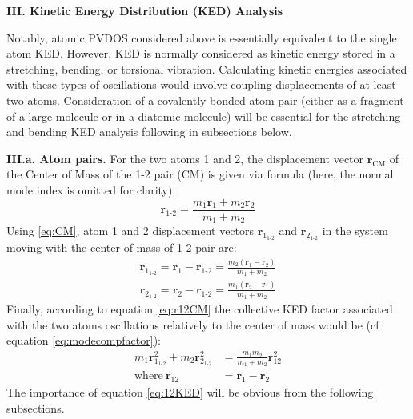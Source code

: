 \documentclass[10pt]{article}
\begin{document}
\vskip 30pt 
 
\noindent
{\bf III. Kinetic Energy Distribution (KED) Analysis}

\vskip 5pt 

Notably, atomic PVDOS considered above is essentially equivalent to the single atom KED. However, KED is normally considered as kinetic energy stored in a stretching,
bending, or torsional vibration. Calculating kinetic energies associated with these types of oscillations would involve coupling displacements of at least two atoms. 
Consideration of a covalently bonded atom pair (either as a fragment of a large molecule or in a diatomic molecule) 
will be essential for the stretching and bending KED analysis following in subsections below.   

\vskip 5pt

{\bf III.a. Atom pairs.} For the two atoms 1 and 2, the displacement vector 
$\boldsymbol{r}_{\textrm{CM}}$ of the Center of Mass of the 1-2 pair (CM) is given via formula (here, the normal mode index is omitted for clarity):
\begin{equation}
\label{eq:CM}       
\boldsymbol{r}_{\textrm{1-2}} = \frac{m_1\boldsymbol{r}_{1} + m_2\boldsymbol{r}_{2}}{m_1 + m_2}   
\end{equation} 
Using \ref{eq:CM}, atom 1 and 2 displacement vectors $\boldsymbol{r}_{1_{\textrm{1-2}}}$ and 
$\boldsymbol{r}_{2_{\textrm{1-2}}}$ in the system moving with the center of mass of 1-2 pair are:
\begin{eqnarray}
\label{eq:r12CM}
\boldsymbol{r}_{1_{\textrm{1-2}}} =  \boldsymbol{r}_{1} - \boldsymbol{r}_{\textrm{1-2}} =  
\frac{m_2(\boldsymbol{r}_{1} - \boldsymbol{r}_{2})}{m_1 + m_2} \\
\boldsymbol{r}_{2_{\textrm{1-2}}}  =  \boldsymbol{r}_{2} - \boldsymbol{r}_{\textrm{1-2}} =  
\frac{m_1(\boldsymbol{r}_{2} - \boldsymbol{r}_{1})}{m_1 + m_2}\nonumber 
\end{eqnarray}
Finally, according to equation \ref{eq:r12CM} the collective KED factor associated with the two atoms oscillations relatively to the center of mass 
would be (cf equation \ref{eq:modecompfactor}):
\begin{align}
\label{eq:12KED}
m_1\boldsymbol{r}^2_{1_{\textrm{1-2}}} + m_2\boldsymbol{r}^2_{2_{\textrm{1-2}}} & = 
\frac{m_1 m_2}{m_1 + m_2} \boldsymbol{r}_{12}^2  \\
\textrm{where} \ \boldsymbol{r}_{12} & = \boldsymbol{r}_{1} - \boldsymbol{r}_{2}\nonumber 
\end{align}  
The importance of equation \ref{eq:12KED} will be obvious from the following subsections. 
\end{document}
